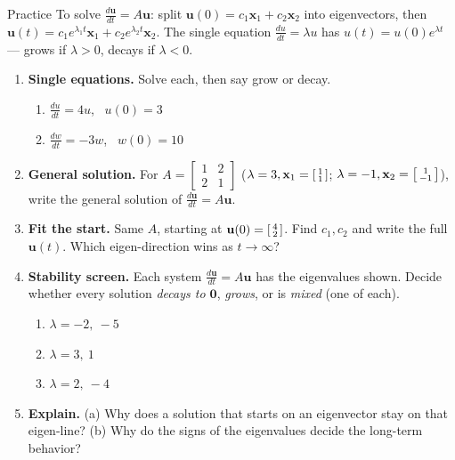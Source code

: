 \documentclass[10pt]{article}
\newcommand{\uu}{\mathbf{u}}
\newcommand{\xx}{\mathbf{x}}
\newcommand{\zero}{\mathbf{0}}
\begin{document}
\namedateperiod

\vspace{0.12in}

\begin{notesbox}{Practice}
To solve $\frac{d\uu}{dt}=A\uu$: split $\uu(0)=c_1\xx_1+c_2\xx_2$ into eigenvectors, then
$\uu(t)=c_1e^{\lambda_1 t}\xx_1+c_2e^{\lambda_2 t}\xx_2$. The single equation $\frac{du}{dt}=\lambda u$ has
$u(t)=u(0)e^{\lambda t}$ --- grows if $\lambda>0$, decays if $\lambda<0$.

\begin{enumerate}[leftmargin=1.9em, itemsep=12pt]
  \item \textbf{Single equations.} Solve each, then say grow or decay.
    \begin{enumerate}[label=(\alph*), leftmargin=1.8em, itemsep=4pt]
      \item $\frac{du}{dt}=4u$, \ $u(0)=3$ \hfill
      \item $\frac{dw}{dt}=-3w$, \ $w(0)=10$
    \end{enumerate}
    \vspace{1.0cm}
  \item \textbf{General solution.} For $A=\begin{bmatrix} 1 & 2 \\ 2 & 1 \end{bmatrix}$
        ($\lambda=3,\xx_1=\begin{bsmallmatrix}1\\1\end{bsmallmatrix}$; $\lambda=-1,\xx_2=\begin{bsmallmatrix}1\\-1\end{bsmallmatrix}$),
        write the general solution of $\frac{d\uu}{dt}=A\uu$. 
  \item \textbf{Fit the start.} Same $A$, starting at $\uu(0)=\begin{bsmallmatrix}4\\2\end{bsmallmatrix}$. Find
        $c_1,c_2$ and write the full $\uu(t)$. Which eigen-direction wins as $t\to\infty$? 
  \item \textbf{Stability screen.} Each system $\frac{d\uu}{dt}=A\uu$ has the eigenvalues shown. Decide whether
        every solution \emph{decays to $\zero$}, \emph{grows}, or is \emph{mixed} (one of each).
    \begin{enumerate}[label=(\alph*), leftmargin=1.8em, itemsep=4pt]
      \item $\lambda=-2,\ -5$ \hfill
      \item $\lambda=3,\ 1$ \hfill
      \item $\lambda=2,\ -4$
    \end{enumerate}
    \vspace{1.1cm}
  \item \textbf{Explain.} (a) Why does a solution that starts on an eigenvector stay on that eigen-line?
        (b) Why do the signs of the eigenvalues decide the long-term behavior? 
\end{enumerate}
\end{notesbox}
\end{document}
